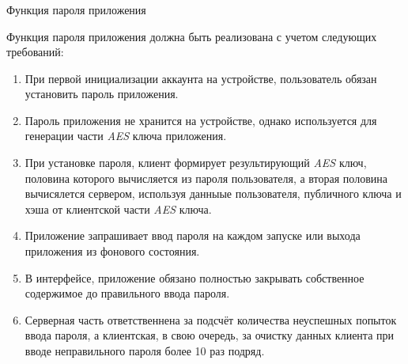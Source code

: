 \subsubsection{} Функция пароля приложения
\label{sec:analysis:research:funcreq:pin}

Функция пароля приложения должна быть реализована с учетом следующих требований:
\begin{enumerate}
	\item При первой инициализации аккаунта на устройстве, пользователь обязан установить пароль приложения.
	\item Пароль приложения не хранится на устройстве, однако используется для генерации части \textit{AES} ключа приложения.
	\item При установке пароля, клиент формирует результирующий \textit{AES} ключ, половина которого вычисляется из пароля пользователя, а вторая половина вычисялется сервером, используя данныые пользователя, публичного ключа и хэша от клиентской части \textit{AES} ключа.
	\item Приложение запрашивает ввод пароля на каждом запуске или выхода приложения из фонового состояния.
	\item В интерфейсе, приложение обязано полностью закрывать собственное содержимое до правильного ввода пароля.
	\item Серверная часть ответственнена за подсчёт количества неуспешных попыток ввода пароля, а клиентская, в свою очередь, за очистку данных клиента при вводе неправильного пароля более 10 раз подряд.
\end{enumerate}
